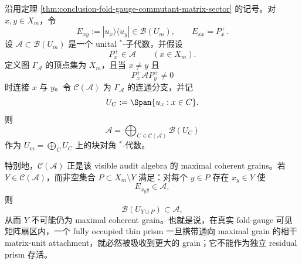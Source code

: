 \begin{theorem}\label{distill:wang_zahl-grain_prism_structure_dichotomy-conclusion-visible-matrix-grains}
沿用定理 \ref{thm:conclusion-fold-gauge-commutant-matrix-sector} 的记号。对 \(x,y\in X_m\)，令
\[
E_{xy}:=|u_x\rangle\langle u_y|\in\mathcal B(U_m),
\qquad E_{xx}=P_x^+.
\]
设 \(\mathcal A\subset\mathcal B(U_m)\) 是一个 unital \(^\ast\)-子代数，并假设
\[
P_x^+\in\mathcal A\qquad(x\in X_m).
\]
定义图 \(\Gamma_{\mathcal A}\) 的顶点集为 \(X_m\)，且当 \(x\ne y\) 且
\[
P_x^+\mathcal A P_y^+\ne 0
\]
时连接 \(x\) 与 \(y\)。令 \(\mathcal C(\mathcal A)\) 为 \(\Gamma_{\mathcal A}\) 的连通分支，并记
\[
U_C:=\Span\{u_x:x\in C\}.
\]
则
\[
\mathcal A=\bigoplus_{C\in\mathcal C(\mathcal A)}\mathcal B(U_C)
\]
作为 \(U_m=\bigoplus_C U_C\) 上的块对角 \(^\ast\)-代数。

特别地，\(\mathcal C(\mathcal A)\) 正是该 visible audit algebra 的 maximal coherent grains。若 \(Y\in\mathcal C(\mathcal A)\)，而非空集合 \(P\subset X_m\setminus Y\) 满足：对每个 \(y\in P\) 存在 \(x_y\in Y\) 使
\[
E_{x_y y}\in\mathcal A,
\]
则
\[
\mathcal B(U_{Y\cup P})\subset\mathcal A,
\]
从而 \(Y\) 不可能仍为 maximal coherent grain。也就是说，在真实 fold-gauge 可见矩阵扇区内，一个 fully occupied thin prism 一旦携带通向 maximal grain 的相干 matrix-unit attachment，就必然被吸收到更大的 grain；它不能作为独立 residual prism 存活。
\end{theorem}
